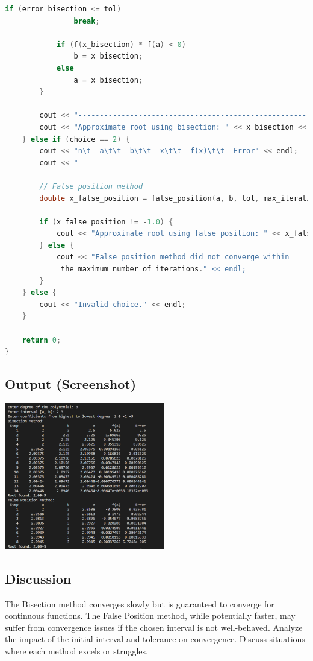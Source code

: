 \documentclass{article}
\begin{document}
\begin{lstlisting}[language=C++]
            if (error_bisection <= tol)
                break;

            if (f(x_bisection) * f(a) < 0)
                b = x_bisection;
            else
                a = x_bisection;
        }

        cout << "--------------------------------------------------------" << endl;
        cout << "Approximate root using bisection: " << x_bisection << endl;
    } else if (choice == 2) {
        cout << "n\t  a\t\t  b\t\t  x\t\t  f(x)\t\t  Error" << endl;
        cout << "--------------------------------------------------------" << endl;

        // False position method
        double x_false_position = false_position(a, b, tol, max_iterations);

        if (x_false_position != -1.0) {
            cout << "Approximate root using false position: " << x_false_position << endl;
        } else {
            cout << "False position method did not converge within
             the maximum number of iterations." << endl;
        }
    } else {
        cout << "Invalid choice." << endl;
    }

    return 0;
}
\end{lstlisting}
\subsection*{Output (Screenshot)}
\includegraphics[width=7cm]{lab1.png}
\subsection*{Discussion}
The Bisection method converges slowly but is guaranteed to converge for continuous functions. The False Position method, while potentially faster, may suffer from convergence issues if the chosen interval is not well-behaved. Analyze the impact of the initial interval and tolerance on convergence. Discuss situations where each method excels or struggles.
\end{document}
